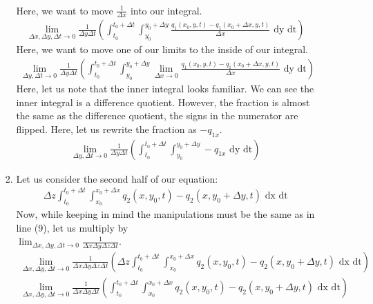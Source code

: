 \documentclass{article}
\begin{document}
\begin{enumerate}
\begin{enumerate}
\begin{enumerate}
\begin{align}
      \end{align}
      Here, we want to move $\frac{1}{\Delta x}$ into our integral.
      \begin{align}
        \lim_{\Delta x, \Delta y, \Delta t \to 0} \frac{1}{\Delta y \Delta t} \left(\int^{t_0 + \Delta t}_{t_0} \int^{y_0 + \Delta y}_{y_0} \frac{q_1(x_0, y, t) - q_1(x_0 + \Delta x, y, t)}{\Delta x} \text{ dy dt}\right)
      \end{align}
      Here, we want to move one of our limits to the inside of our integral.
      \begin{align}
        \lim_{\Delta y, \Delta t \to 0} \frac{1}{\Delta y \Delta t} \left(\int^{t_0 + \Delta t}_{t_0} \int^{y_0 + \Delta y}_{y_0}
        \lim_{\Delta x \to 0} \frac{q_1(x_0, y, t) - q_1(x_0 + \Delta x, y, t)}{\Delta x} \text{ dy dt}\right)
      \end{align}
      Here, let us note that the inner integral looks familiar. We can see the inner integral is a difference quotient. However, the fraction is almost the same as the difference quotient, the signs in the numerator are flipped. Here, let us rewrite the fraction as $-q_{1x}$.
      \begin{align}
        \lim_{\Delta y, \Delta t \to 0} \frac{1}{\Delta y \Delta t} \left(\int^{t_0 + \Delta t}_{t_0} \int^{y_0 + \Delta y}_{y_0}
        -q_{1x} \text{ dy dt}\right)
      \end{align}
      \item Let us consider the second half of our equation:
      \begin{align}
        \Delta z \int^{t_0 + \Delta t}_{t_0} \int^{x_0 + \Delta x}_{x_0} q_2(x, y_0, t) - q_2(x, y_0 + \Delta y, t) \text{ dx dt}
      \end{align}
      Now, while keeping in mind the manipulations must be the same as in line (9), let us multiply by\\
      $\displaystyle \lim_{\Delta x, \Delta y, \Delta t \to 0} \frac{1}{\Delta x \Delta y \Delta z \Delta t}$.
      \begin{align}
        \lim_{\Delta x, \Delta y, \Delta t \to 0} \frac{1}{\Delta x \Delta y \Delta z \Delta t} \left(\Delta z \int^{t_0 + \Delta t}_{t_0} \int^{x_0 + \Delta x}_{x_0} q_2(x, y_0, t) - q_2(x, y_0 + \Delta y, t) \text{ dx dt}\right)\\
        \lim_{\Delta x, \Delta y, \Delta t \to 0} \frac{1}{\Delta x \Delta y \Delta t} \left(\int^{t_0 + \Delta t}_{t_0} \int^{x_0 + \Delta x}_{x_0} q_2(x, y_0, t) - q_2(x, y_0 + \Delta y, t) \text{ dx dt}\right)

\end{align}
\end{enumerate}
\end{enumerate}
\end{enumerate}
\end{document}
